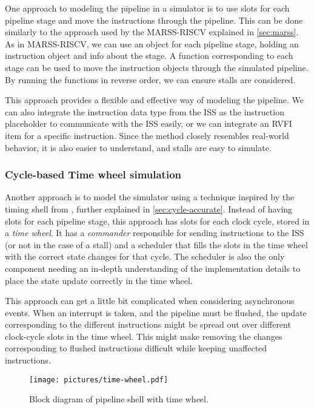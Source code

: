 One approach to modeling the pipeline in a simulator is to use slots for each pipeline stage and move the instructions through the pipeline.
This can be done similarly to the approach used by the MARSS-RISCV explained in \cref{sec:marss}. As in MARSS-RISCV, we can use an object for each pipeline stage, holding an instruction object and info about the stage. A function corresponding to each stage can be used to move the instruction objects through the simulated pipeline. By running the functions in reverse order, we can ensure stalls are considered.

This approach provides a flexible and effective way of modeling the pipeline. We can also integrate the instruction data type from the ISS as the instruction placeholder to communicate with the ISS easily, or we can integrate an RVFI item for a specific instruction. Since the method closely resembles real-world behavior, it is also easier to understand, and stalls are easy to simulate.


\subsubsection{Cycle-based Time wheel simulation}
\label{sec:timeWheel}

Another approach is to model the simulator using a technique inspired by the timing shell from \cite{chiang_efficient_2009}, further explained in \cref{sec:cycle-accurate}. Instead of having slots for each pipeline stage, this approach has slots for each clock cycle, stored in a \textit{time wheel}. It has a \textit{commander} responsible for sending instructions to the ISS (or not in the case of a stall) and a scheduler that fills the slots in the time wheel with the correct state changes for that cycle. The scheduler is also the only component needing an in-depth understanding of the implementation details to place the state update correctly in the time wheel. 

This approach can get a little bit complicated when considering asynchronous events. When an interrupt is taken, and the pipeline must be flushed, the update corresponding to the different instructions might be spread out over different clock-cycle slots in the time wheel. This might make removing the changes corresponding to flushed instructions difficult while keeping unaffected instructions.


\begin{figure}[ht]
    \centering
    \texttt{[image: pictures/time-wheel.pdf]}
    \caption{Block diagram of pipeline shell with time wheel.}
    \label{fig:time-wheel}
\end{figure}


